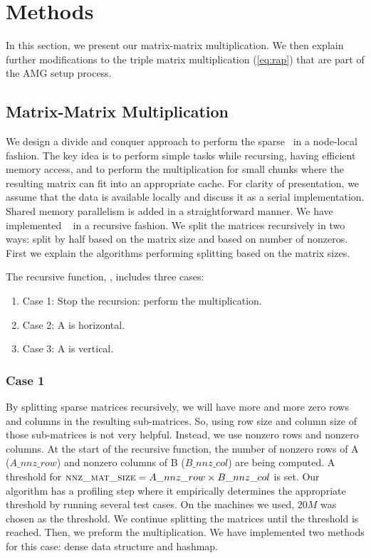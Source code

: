 \section{Methods}
\label{sec:methods}

In this section, we present our matrix-matrix multiplication. We then explain further modifications to the triple matrix multiplication (\ref{eq:rap}) that are part of the AMG setup process.

\subsection{Matrix-Matrix Multiplication}
\label{sec:matmult}

We design a divide and conquer approach to perform the sparse \mm\ in a node-local fashion. The key idea is to perform simple tasks while recursing, having efficient memory access, and to perform the multiplication for small chunks where the resulting matrix can fit into an appropriate cache. For clarity of presentation, we assume that the data is available locally and discuss it as a serial implementation. Shared memory parallelism is added in a straightforward manner. We have implemented \mm~ in a recursive fashion. We split the matrices recursively in two ways: split by half based on the matrix size and based on number of nonzeros. First we explain the algorithms performing splitting based on the matrix sizes.

The recursive function, \recmm, includes three cases:
\begin{enumerate}
 \item Case 1: Stop the recursion: perform the multiplication.
 \item Case 2: A is horizontal.
 \item Case 3: A is vertical.
\end{enumerate}

\subsubsection{Case 1}
\label{sec:case1}
By splitting sparse matrices recursively, we will have more and more zero rows and columns in the resulting sub-matrices. So, using row size and column size of those sub-matrices is not very helpful. Instead, we use nonzero rows and nonzero columns.
At the start of the recursive function, the number of nonzero rows of A ($A\_nnz\_row$) and nonzero columns of B ($B\_nnz\_col$) are being computed. A threshold for $\textsc{nnz\_mat\_size} = A\_nnz\_row \times B\_nnz\_col$ is set. Our algorithm has a profiling step where it empirically determines the appropriate threshold by running several test cases. On the machines we used,  $20M$ was chosen as the threshold. We continue splitting the matrices until the threshold is reached. Then, we preform the multiplication. We have implemented two methods for this case: dense data structure and hashmap.


